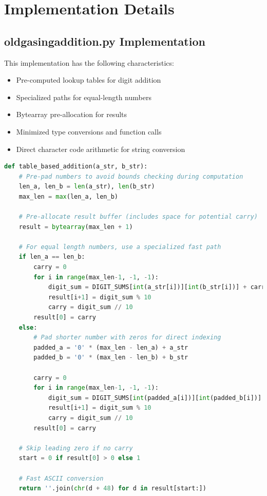 \documentclass{article}
\begin{document}
\section{Implementation Details}

\subsection{oldgasingaddition.py Implementation}

This implementation has the following characteristics:
\begin{itemize}
    \item Pre-computed lookup tables for digit addition
    \item Specialized paths for equal-length numbers
    \item Bytearray pre-allocation for results
    \item Minimized type conversions and function calls
    \item Direct character code arithmetic for string conversion
\end{itemize}

\begin{lstlisting}[language=Python, caption=oldgasingaddition.py Implementation]
def table_based_addition(a_str, b_str):
    # Pre-pad numbers to avoid bounds checking during computation
    len_a, len_b = len(a_str), len(b_str)
    max_len = max(len_a, len_b)
    
    # Pre-allocate result buffer (includes space for potential carry)
    result = bytearray(max_len + 1)
    
    # For equal length numbers, use a specialized fast path
    if len_a == len_b:
        carry = 0
        for i in range(max_len-1, -1, -1):
            digit_sum = DIGIT_SUMS[int(a_str[i])][int(b_str[i])] + carry
            result[i+1] = digit_sum % 10
            carry = digit_sum // 10
        result[0] = carry
    else:
        # Pad shorter number with zeros for direct indexing
        padded_a = '0' * (max_len - len_a) + a_str
        padded_b = '0' * (max_len - len_b) + b_str
        
        carry = 0
        for i in range(max_len-1, -1, -1):
            digit_sum = DIGIT_SUMS[int(padded_a[i])][int(padded_b[i])] + carry
            result[i+1] = digit_sum % 10
            carry = digit_sum // 10
        result[0] = carry
    
    # Skip leading zero if no carry
    start = 0 if result[0] > 0 else 1
    
    # Fast ASCII conversion
    return ''.join(chr(d + 48) for d in result[start:])
\end{lstlisting}
\end{document}
